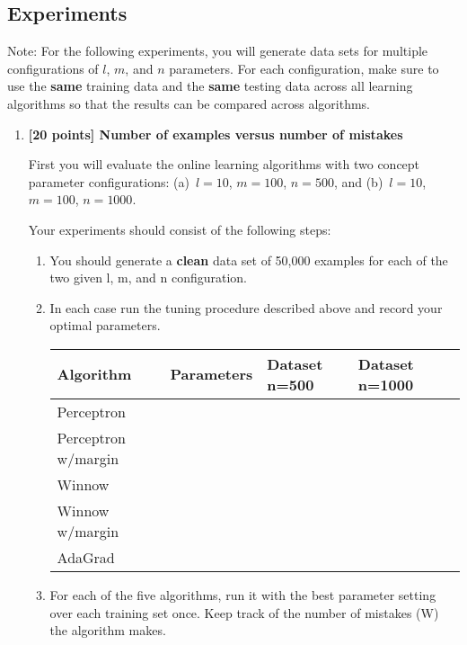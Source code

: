 \subsection*{Experiments}

Note: For the following experiments, you will generate data sets for
multiple configurations of $l$, $m$, and $n$ parameters. For each
configuration, make sure to use the \textbf{same} training data and
the \textbf{same} testing data across all learning algorithms so that
the results can be compared across algorithms.

\begin{enumerate}
\item {\bf [20 points] Number of examples versus number of mistakes}

First you will evaluate the online learning algorithms with two
concept parameter configurations: (a)~$l=10$, $m=100$, $n=500$, and
(b)~$l=10$, $m=100$, $n=1000$.

Your experiments should consist of the following steps:

\begin{enumerate}
\item You should generate a {\bf clean} data set of 50,000 examples for each of the two given l, m, and n configuration.

\item In each case run the tuning procedure described above and record your optimal
parameters.

  \begin{center}
    \begin{tabular}{|p{3.0cm}|p{2.2cm}|p{2.5cm}|p{2.5cm}|p{2.5cm}|}
      \hline
      Algorithm               &  Parameters & Dataset n=500 & Dataset n=1000\\\hline\hline
      Perceptron              &             &               &      \\\hline
      Perceptron w/margin     &             &               &      \\\hline
      Winnow                  &             &               &      \\\hline
      Winnow w/margin         &             &               &      \\\hline
      AdaGrad                 &             &               &      \\\hline
    \end{tabular}
  \end{center}

\item For each of the five algorithms, run it with the best parameter setting over each training set once. Keep track of the number of mistakes (W) the algorithm makes.


\end{enumerate}
\end{enumerate}
